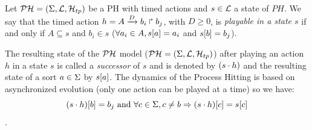\begin{definition} 
\label{def:playableAction}
Let $\mathcal{PH} = (\Sigma,\mathcal{L},\mathcal{H}_{tp})$ be a PH with timed actions and $s \in \mathcal{L}$ a state of $PH$.
We say that the timed action $h = A\xrightarrow{D} b_i \Rsh b_j$, with $D \geq 0 $,
is \emph{playable in a state $s$} if and only if
$A \subseteq s$ and $b_i \in s$ (\ie$ \forall a_i \in A, {s[a]} = a_i$ and ${s[b]}=b_j$).
\end{definition}

%
%
%
%

The resulting state of the $\mathcal{PH}$ model ($\mathcal{PH} = (\Sigma,\mathcal{L},\mathcal{H}_{tp})$) after playing an action $h$ in a state $s$ is called a \emph{successor} of $s$ and is denoted by $(s \cdot h)$ and the resulting state of a sort $a \in \Sigma$ by ${s[a]}$. The dynamics of the Process Hitting is based on asynchronized evolution (only one action can be played at a time) so we have: $${(s \cdot h)[b]} = b_j \text{ and } \forall c \in \Sigma, c \neq b \Rightarrow {(s \cdot h)[c]}={s[c]}$$.

